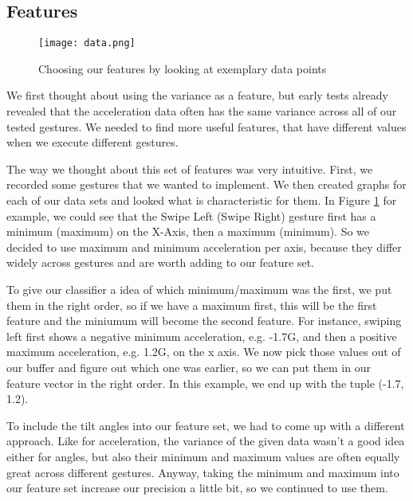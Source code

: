 \subsection{Features}
\label{ch:DataCollection:sec:FeatureDesign:sub:Features}

\begin{figure}
\begin{center}
  \texttt{[image: data.png]}
\caption{Choosing our features by looking at exemplary data points}\label{fig:datamining}
\end{center}
\end{figure} 

We  first  thought  about  using  the  variance  as  a  feature,  but  early  tests  already revealed  that  the  acceleration  data  often  has  the same variance across all of our tested gestures. We needed to find more useful features, that have different values when we execute different gestures.

The way we thought about this set of features was very intuitive. First, we recorded some gestures that we wanted to implement.
We then created graphs for each of our data sets and looked what is characteristic for them.
In Figure \ref{fig:datamining} for example, we could see that the Swipe Left (Swipe Right) gesture first has a minimum (maximum) on the X-Axis, then a maximum (minimum).
So we decided to use maximum  and  minimum  acceleration  per  axis, because they  differ  widely  across gestures  and  are  worth  adding  to  our  feature  set.

To give our classifier a idea of which minimum/maximum was the first, we put them in the right order, so if we have a maximum first, this will be the first feature and the miniumum will become the second feature.
For  instance,  swiping  left  first  shows  a negative  minimum  acceleration, e.g. -1.7G, and then a positive  maximum acceleration, e.g. 1.2G, on the x axis.
We now pick those values out of our buffer and figure out which one was earlier, so we can put them in our feature vector in the right order.
In  this example, we end up with the tuple (-1.7, 1.2).

To include the tilt angles into our feature set, we had to come up with a different approach.
Like for acceleration, the variance of the given data wasn't a good idea either for angles, but also their minimum and maximum values are often equally great across different gestures.
Anyway, taking the minimum and maximum into our feature set increase our precision a little bit, so we continued to use them.

